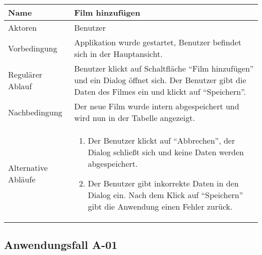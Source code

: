 \documentclass[oneside,german,oneside]{scrbook}
\begin{document}
      \begin{tabular}{|b|p{10cm}|}
        \hline
        Name & Film hinzuf\"ugen \\
        \hline
        Aktoren & Benutzer \\
        \hline
        \hline
        Vorbedingung & Applikation wurde gestartet, Benutzer befindet sich in
        der Hauptansicht.\\
        \hline
        Regul\"arer Ablauf & Benutzer klickt auf Schaltfl\"ache ``Film hinzuf\"ugen''
        und ein Dialog \"offnet sich. Der Benutzer gibt die Daten des Filmes ein
        und klickt auf ``Speichern''.\\
        \hline
        Nachbedingung & Der neue Film wurde intern abgespeichert und wird nun
        in der Tabelle angezeigt.\\
        \hline
        Alternative Abl\"aufe &
        \begin{enumerate}
          \item Der Benutzer klickt auf ``Abbrechen'', der Dialog schlie{\ss}t sich
          und keine Daten werden abgespeichert.
          \item Der Benutzer gibt inkorrekte Daten in den Dialog ein. Nach dem
          Klick auf ``Speichern'' gibt die Anwendung einen Fehler zur\"uck.
        \end{enumerate}
        \\
        \hline
      \end{tabular}

    \subsection{Anwendungsfall A-01}\label{uc:01}
\end{document}
